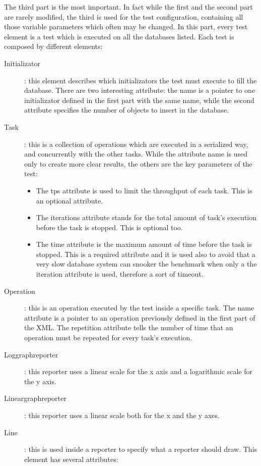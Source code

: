The third part is the most important. In fact while the first and the second part are rarely modified, the third is used for the test configuration, containing all those variable parameters which often may be changed. In this part, every test element is a test which is executed on all the databases listed. Each test is composed by different elements:
\begin{description}
	\item[Initializator]: this element describes which initializators the test must execute to fill the database. There are two interesting attribute: the name is a pointer to one initializator defined in the first part with the same name, while the second attribute specifies the number of objects to insert in the database.
	\item[Task]: this is a collection of operations which are executed in a serialized way, and concurrently with the other tasks. While the attribute name is used only to create more clear results, the others are the key parameters of the test: 	
	
	\begin{itemize}
		\item The tps attribute is used to limit the throughput of each task. This is an optional attribute.
		\item The iterations attribute stands for the total amount of task's execution before the task is stopped. This is optional too.
		\item The time attribute is the maximum amount of time before the task is stopped. This is a required attribute and it is used also to avoid that a very slow database system can snooker the benchmark when only a the iteration attribute is used, therefore a sort of timeout. 
	\end{itemize}	
	
	\item[Operation]: this is an operation executed by the test inside a specific task. The name attribute is a pointer to an operation previously defined in the first part of the XML. The repetition attribute tells the number of time that an operation must be repeated for every task's execution.
	\item[Loggraphreporter]: this reporter uses a linear scale for the x axis and a logarithmic scale for the y axis.
	\item[Lineargraphreporter]: this reporter uses a linear scale both for the x and the y axes. 
	\item[Line]: this is used inside a reporter to specify what a reporter should draw. This element has several attributes:
	

\end{description}
